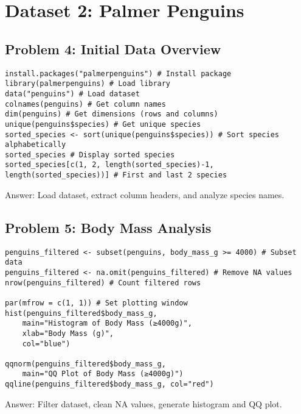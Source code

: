 \documentclass[12pt]{article}
\begin{document}
\section{Dataset 2: Palmer Penguins}

\subsection{Problem 4: Initial Data Overview}
\begin{lstlisting}
install.packages("palmerpenguins") # Install package
library(palmerpenguins) # Load library
data("penguins") # Load dataset
colnames(penguins) # Get column names
dim(penguins) # Get dimensions (rows and columns)
unique(penguins$species) # Get unique species
sorted_species <- sort(unique(penguins$species)) # Sort species alphabetically
sorted_species # Display sorted species
sorted_species[c(1, 2, length(sorted_species)-1, length(sorted_species))] # First and last 2 species
\end{lstlisting}
Answer: Load dataset, extract column headers, and analyze species names.

\subsection{Problem 5: Body Mass Analysis}
\begin{lstlisting}
penguins_filtered <- subset(penguins, body_mass_g >= 4000) # Subset data
penguins_filtered <- na.omit(penguins_filtered) # Remove NA values
nrow(penguins_filtered) # Count filtered rows

par(mfrow = c(1, 1)) # Set plotting window
hist(penguins_filtered$body_mass_g, 
    main="Histogram of Body Mass (≥4000g)",
    xlab="Body Mass (g)",
    col="blue")

qqnorm(penguins_filtered$body_mass_g, 
    main="QQ Plot of Body Mass (≥4000g)")
qqline(penguins_filtered$body_mass_g, col="red")
\end{lstlisting}
Answer: Filter dataset, clean NA values, generate histogram and QQ plot.
\end{document}
